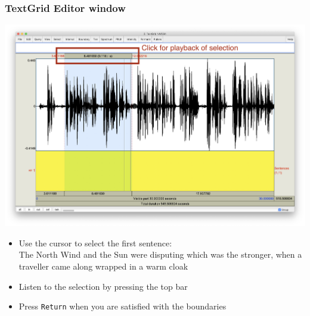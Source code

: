 \documentclass{beamer}
\begin{document}
\begin{frame} 
\frametitle{TextGrid Editor window} 

\includegraphics[width=0.71\framewidth]{img/Screenshot_TextGrid}
\vspace{-0.5cm}
\begin{itemize}
\item Use the cursor to select the first sentence:\\
      {\scriptsize{The North Wind and the Sun were disputing which was the stronger, when a traveller came along wrapped in a warm cloak}}
\item Listen to the selection by pressing the top bar
\item Press \texttt{Return} when you are satisfied with the boundaries
\end{itemize}

\end{frame}
\end{document}
